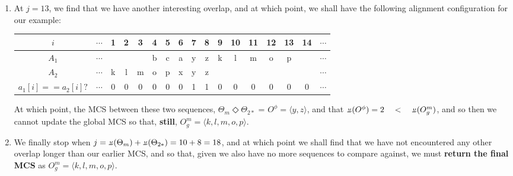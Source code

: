 \documentclass[a4paper, 18pt]{article} %
\newcommand{\invpi}{\rotatebox[origin=c]{180}{$\pi$}}
\begin{document}
\begin{enumerate}
{\begin{adjustwidth}{0em}{}
\begin{tabular}[H]{|c||c|c|c|c|c|c|c|c|c|c|c|c|c|}
\end{tabular}
\end{adjustwidth}
\vspace{1em}

At which point, the MCS between these two sequences, $\Theta_m \Diamond \Theta_{2*}$ = $O^\phi = \langle \rangle$, and that $\invpi(O^\phi) = 0 \quad < \quad \invpi(O^m_g)$, and so then we cannot update the global MCS so that, \textbf{still}, $O^m_g = \langle k, l, m, o, p\rangle$.


}
\item{ At $j =  13$, we find that we have another interesting overlap, and at which point, we shall have the following alignment configuration for our example:

\vspace{1em}
\begin{adjustwidth}{0em}{}
\begin{tabular}[H]{|c||c|c|c|c|c|c|c|c|c|c|c|c|c|c|c|c|}
\hline
$i$ & $\cdots$ & 1 & 2 & 3 & 4 & 5 & 6 & 7 & 8 & 9 & 10 & 11 & 12 & 13 & 14 & $\cdots$ \\
\hline
$A_1$ & $\cdots$ & & & & b & c & a & y & z & k & l & m & o & p & &$\cdots$ \\
\hline
$A_2$ & $\cdots$ & k & l & m & o & p & x & y & z &  &  & & & & &$\cdots$\\
\hline
$a_1[i]==a_2[i]?$ & $\cdots$ & 0& 0 & 0 & 0 & 0 & 0 & 1 & 1 & 0 & 0 & 0 & 0 & 0  &0 & $\cdots$ \\
\hline
 
\end{tabular}
\end{adjustwidth}
\vspace{1em}

At which point, the MCS between these two sequences, $\Theta_m \Diamond \Theta_{2*}$ = $O^\phi = \langle y, z\rangle$, and that $\invpi(O^\phi) = 2 \quad < \quad \invpi(O^m_g)$, and so then we cannot update the global MCS so that, \textbf{still}, $O^m_g = \langle k, l, m, o, p\rangle$.


}
\item We finally stop when $j = \invpi(\Theta_m) + \invpi(\Theta_{2*}) = 10 + 8 = 18$, and at which point we shall find that we have not encountered any other overlap longer than our earlier MCS, and so that, given we also have no more sequences to compare against, we must \textbf{return the final MCS} as $O^m_g = \langle k, l, m, o, p\rangle$.
\end{enumerate}
\end{document}
